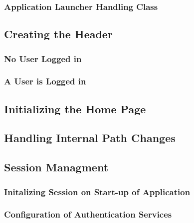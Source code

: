 \subsubsection{Application Launcher Handling Class}


\newpage
\subsection{Creating the Header}

\subsubsection{No User Logged in}


\subsubsection{A User is Logged in}


\subsection{Initializing the Home Page}


\subsection{Handling Internal Path Changes}


\subsection{Session Managment}

\subsubsection{Initalizing Session on Start-up of Application}


\subsubsection{Configuration of Authentication Services}


